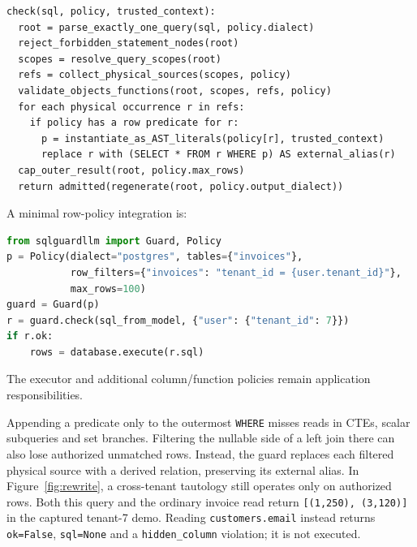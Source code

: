 \documentclass[sigconf,nonacm,natbib=false]{acmart}
\begin{document}
\begin{lstlisting}[caption={Conceptual algorithm. CTE names resolve per scope, rather than forming a global exception to table checks.}]
check(sql, policy, trusted_context):
  root = parse_exactly_one_query(sql, policy.dialect)
  reject_forbidden_statement_nodes(root)
  scopes = resolve_query_scopes(root)
  refs = collect_physical_sources(scopes, policy)
  validate_objects_functions(root, scopes, refs, policy)
  for each physical occurrence r in refs:
    if policy has a row predicate for r:
      p = instantiate_as_AST_literals(policy[r], trusted_context)
      replace r with (SELECT * FROM r WHERE p) AS external_alias(r)
  cap_outer_result(root, policy.max_rows)
  return admitted(regenerate(root, policy.output_dialect))
\end{lstlisting}

A minimal row-policy integration is:
\begin{lstlisting}[language=Python]
from sqlguardllm import Guard, Policy
p = Policy(dialect="postgres", tables={"invoices"},
           row_filters={"invoices": "tenant_id = {user.tenant_id}"},
           max_rows=100)
guard = Guard(p)
r = guard.check(sql_from_model, {"user": {"tenant_id": 7}})
if r.ok:
    rows = database.execute(r.sql)
\end{lstlisting}
The executor and additional column/function policies remain application
responsibilities.

Appending a predicate only to the outermost \texttt{WHERE} misses reads in
CTEs, scalar subqueries and set branches. Filtering the nullable side of a
left join there can also lose authorized unmatched rows. Instead, the guard
replaces each filtered physical source with a derived relation, preserving
its external alias. In Figure~\ref{fig:rewrite}, a cross-tenant tautology
still operates only on authorized rows. Both this query and the ordinary
invoice read return \texttt{[(1,250), (3,120)]} in the captured tenant-7 demo.
Reading \texttt{customers.email} instead returns \texttt{ok=False},
\texttt{sql=None} and a \texttt{hidden\_column} violation; it is not executed.
\end{document}
